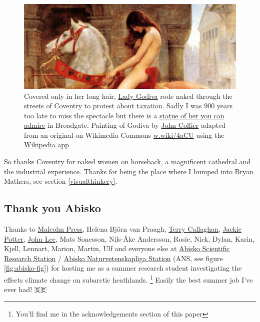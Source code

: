 \documentclass[
]{book}
\begin{document}
\begin{figure}

{\centering \includegraphics[width=1\linewidth]{images/godiva} 

}

\caption{Covered only in her long hair, \href{https://en.wikipedia.org/wiki/Lady_Godiva}{Lady Godiva} rode naked through the streets of Coventry to protest about taxation. Sadly I was 900 years too late to miss the spectacle but there is a \href{https://w.wiki/4aD4}{statue of her you can admire} in Broadgate. Painting of Godiva by \href{https://en.wikipedia.org/wiki/John_Collier_(painter)}{John Collier} adapted from an original on Wikimedia Commons \href{https://w.wiki/4aCU}{w.wiki/4aCU} using the \href{https://apps.apple.com/us/app/wikipedia/id324715238}{Wikipedia app}}\label{fig:coventry-fig}
\end{figure}



So thanks Coventry for naked women on horseback, a \href{https://en.wikipedia.org/wiki/Coventry_Cathedral}{magnificent cathedral} and the industrial experience. Thanks for being the place where I bumped into Bryan Mathers, see section \ref{visualthinkery}. 🙏

\hypertarget{abisko}{%
\subsection{Thank you Abisko}\label{abisko}}

Thanks to \href{https://en.wikipedia.org/wiki/Malcolm_Press}{Malcolm Press}, Helena Björn van Praagh, \href{https://en.wikipedia.org/wiki/Terry_Callaghan}{Terry Callaghan}, \href{https://www.brookes.ac.uk/ocsld/about-ocsld/staff-profiles/jackie-potter/}{Jackie Potter}, \href{https://www.sheffield.ac.uk/biosciences/people/academic-staff/john-lee}{John Lee}, Mats Sonesson, Nils-Åke Andersson, Rosie, Nick, Dylan, Karin, Kjell, Lennart, Marion, Martin, Ulf and everyone else at \href{https://en.wikipedia.org/wiki/Abisko_Scientific_Research_Station}{Abisko Scientific Research Station} / \href{https://sv.wikipedia.org/wiki/Abisko_naturvetenskapliga_station}{Abisko Naturvetenskapliga Station} (ANS, see figure \ref{fig:abisko-fig}) for hosting me as a summer research student investigating the effects climate change on subarctic heathlands. \citep{subarctic}\footnote{You'll find me in the acknowledgements section of this paper} Easily the best summer job I've ever had! 🇸🇪
\end{document}
